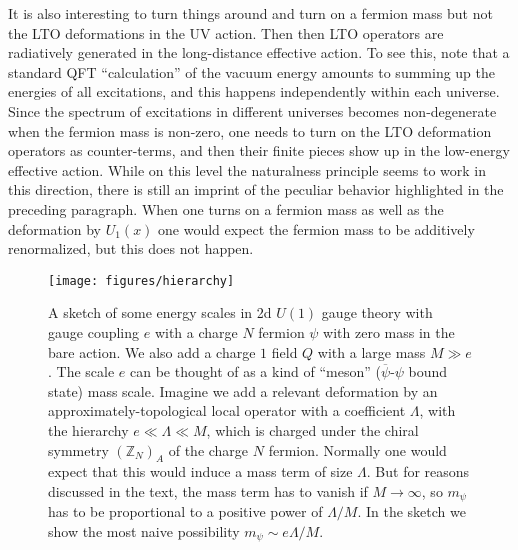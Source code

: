 \documentclass[11pt]{article}
\def\bar{\overline}
\begin{document}
It is also interesting to turn things around and turn on a fermion mass but not the LTO deformations in the UV action.  Then then LTO operators are radiatively generated in the long-distance effective action.  To see this, note that a standard QFT ``calculation'' of the vacuum energy amounts to summing up the energies of all excitations, and this happens independently within each universe. Since the spectrum of excitations in different universes becomes non-degenerate when the fermion mass is non-zero, one needs to turn on the LTO deformation operators as counter-terms, and then their finite pieces show up in the low-energy effective action.  While on this level  the naturalness principle seems to  work in this direction,  there is still an imprint of the peculiar behavior highlighted in the preceding paragraph.  When one turns on a fermion mass as well as the deformation by $U_{1}(x)$
one would expect the fermion mass to be additively renormalized, but this does not happen.  


\begin{figure}[t]
\centering
\texttt{[image: figures/hierarchy]}
\caption{A sketch of some energy scales in 2d $U(1)$ gauge theory with gauge coupling $e$ 
with a charge $N$ fermion $\psi$ with zero mass in the bare action.  We also add a charge 
$1$ field $Q$ with a large mass $M \gg e$.   The scale $e$ can be thought of as a kind 
of ``meson'' ($\bar{\psi}$-$\psi$ bound state) mass scale. Imagine we add a relevant 
deformation by an approximately-topological local operator with a coefficient $\Lambda$, 
with the hierarchy $e \ll \Lambda \ll M$, which is charged under the chiral symmetry 
$(\mathbb{Z}_N)_A$ of the charge $N$ fermion.  Normally one would expect that this 
would induce a mass term of size $\Lambda$.  But for reasons discussed in the text, the 
mass term has to vanish if $M \to \infty$, so $m_{\psi}$ has to be proportional to a 
positive power of $\Lambda/M$.  In the sketch we show the most naive possibility 
$m_{\psi} \sim e \Lambda/M$.
} 
\label{fig:scales} 
\end{figure}
\end{document}
